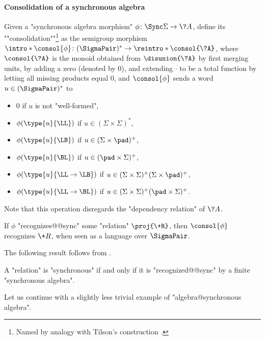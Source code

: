 \paragraph*{Consolidation of a synchronous algebra}
Given a "synchronous algebra morphism" $\phi\colon \Sync\Sigma \to \?A$,
define its \AP""consolidation""\footnote{Named by analogy with Tilson's construction \cite[\S 3, p.~102]{tilson_categories_1987}.} as the semigroup morphism
$\intro*\consol{\phi}\colon (\SigmaPair)^* \to \reintro*\consol{\?A}$, where
$\consol{\?A}$ is the monoid obtained from
$\disunion{\?A}$ by first merging units,
by adding a zero (denoted by $0$), and extending $\cdot$
to be a total function by letting all missing products equal $0$,
and $\consol{\phi}$ sends a word $u \in (\SigmaPair)^*$ to%
\vspace{-1.25em}
\begin{multicols}{2}%
	\begin{itemize}%
		\item $0$ if $u$ is not "well-formed",
		\item $\phi(\type{u}{\LL})$ if $u \in (\Sigma\times \Sigma)^*$,
		\item $\phi(\type{u}{\LB})$ if $u \in (\Sigma\times \pad)^+$,
		\item $\phi(\type{u}{\BL})$ if $u \in (\pad\times \Sigma)^+$,
		\item $\phi(\type{u}{\LL\to\LB})$ if $u \in (\Sigma\times \Sigma)^+(\Sigma\times \pad)^+$,
		\item $\phi(\type{u}{\LL\to\BL})$ if $u \in (\Sigma\times \Sigma)^+(\pad\times \Sigma)^+$.
	\end{itemize}
\end{multicols}
\vspace{-1.25em}
Note that this operation disregards the "dependency relation" of $\?A$.
\begin{fact}
	\label{fact:consolidation}
	If $\phi$ "recognizes@@sync" some "relation" $\proj{\+R}$,
	then $\consol{\phi}$ recognizes $\+R$, when seen as
	a language over $\SigmaPair$.
\end{fact}

The following result follows from .
\begin{proposition}
	\label{prop:synchronous-iff-finite}
	A "relation" is "synchronous" if and only if it is "recognized@@sync"
	by a finite "synchronous algebra".
\end{proposition}

Let us continue with a slightly less trivial example of "algebra@synchronous algebra".

